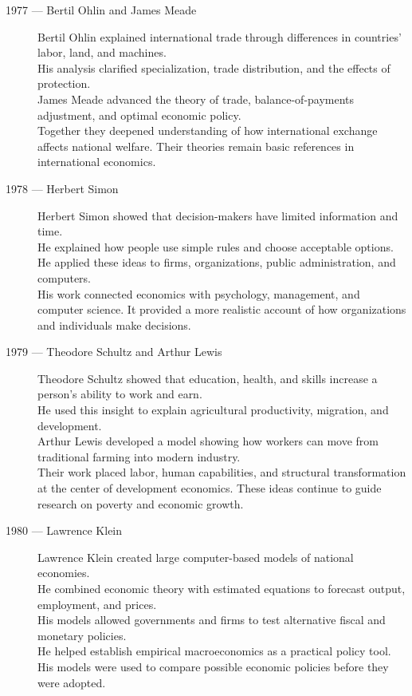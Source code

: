 \documentclass[12pt]{report}
\begin{document}
{\begin{description}
\item[1977 --- Bertil Ohlin and James Meade]
Bertil Ohlin explained international trade through differences in countries' labor, land, and machines.\\
His analysis clarified specialization, trade distribution, and the effects of protection.\\
James Meade advanced the theory of trade, balance-of-payments adjustment, and optimal economic policy.\\
Together they deepened understanding of how international exchange affects national welfare. Their theories remain basic references in international economics.

\item[1978 --- Herbert Simon]
Herbert Simon showed that decision-makers have limited information and time.\\
He explained how people use simple rules and choose acceptable options.\\
He applied these ideas to firms, organizations, public administration, and computers.\\
His work connected economics with psychology, management, and computer science. It provided a more realistic account of how organizations and individuals make decisions.

\item[1979 --- Theodore Schultz and Arthur Lewis]
Theodore Schultz showed that education, health, and skills increase a person's ability to work and earn.\\
He used this insight to explain agricultural productivity, migration, and development.\\
Arthur Lewis developed a model showing how workers can move from traditional farming into modern industry.\\
Their work placed labor, human capabilities, and structural transformation at the center of development economics. These ideas continue to guide research on poverty and economic growth.

\item[1980 --- Lawrence Klein]
Lawrence Klein created large computer-based models of national economies.\\
He combined economic theory with estimated equations to forecast output, employment, and prices.\\
His models allowed governments and firms to test alternative fiscal and monetary policies.\\
He helped establish empirical macroeconomics as a practical policy tool. His models were used to compare possible economic policies before they were adopted.


\end{description}}
\end{document}
